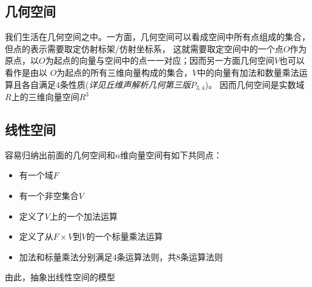 \subsection{几何空间}
我们生活在几何空间之中。一方面，几何空间可以看成空间中所有点组成的集合，但点的表示需要取定仿射标架/仿射坐标系，
这就需要取定空间中的一个点$O$作为原点，以$O$为起点的向量与空间中的点一一对应；因而另一方面几何空间$V$也可以看作是由以
$O$为起点的所有三维向量构成的集合，$V$中的向量有加法和数量乘法运算且各自满足$4$条性质(\emph{详见丘维声解析几何第三版$P_{3,4}$})。
因而几何空间是实数域$R$上的三维向量空间$R^3$

\subsection{线性空间}
容易归纳出前面的几何空间和$n$维向量空间有如下共同点：
\begin{itemize}
    \item 有一个域$F$
    \item 有一个非空集合$V$
    \item 定义了$V$上的一个加法运算
    \item 定义了从$F \times V$到$V$的一个标量乘法运算
    \item 加法和标量乘法分别满足$4$条运算法则，共$8$条运算法则
\end{itemize}
由此，抽象出线性空间的模型

